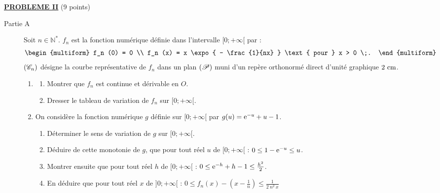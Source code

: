 \noindent \underline{\textsc{\textbf{PROBLEME II}}} (9 points) 
      \begin{description}
            \item[Partie A]
                  Soit $n\in\mathbb{N}^*$.
                  $f_n$ est la fonction num\'erique d\'efinie dans l'intervalle $[0;+\infty[$ par : 
                  \[
                        \begin{multiform}
                              f_n (0) = 0 \\
                              f_n (x) = x \expo{ - \frac{1}{nx} } \text{ pour } x > 0 \;.
                        \end{multiform}
                  \]
                  $(\mathscr{C}_n)$ d\'esigne la courbe repr\'esentative de $f_n$ dans un plan $(\mathscr{P})$ muni d'un rep\`ere orthonorm\'e
                  direct \Oij{} d'unit\'e graphique $2~\mathrm{cm}$.
                  \begin{enumerate}
                        \item \begin{enumerate}
                                    \item Montrer que $f_n$ est continue et d\'erivable en $O$.
                                    \item Dresser le tableau de variation de $f_n$ sur $[0;+\infty[$.
                              \end{enumerate}
                        \item On consid\`ere la fonction num\'erique $g$ d\'efinie sur $[0;+\infty[$ par 
                              $g(u) = \mathrm{e}^{-u} + u - 1$.
                              \begin{enumerate}
                                    \item D\'eterminer le sens de variation de $g$ sur $[0;+\infty[$.
                                    \item D\'eduire de cette monotonie de $g$, que pour tout r\'eel $u$ de $[0;+\infty[$ :
                                          $0 \leq 1 - \mathrm{e}^{-u} \leq u$.
                                    \item Montrer ensuite que pour tout r\'eel $h$ de $[0;+\infty[$ : 
                                          $0 \leq \mathrm{e}^{-h} + h - 1 \leq \frac{h^2}{2}$.
                                    \item En d\'eduire que pour tout r\'eel $x$ de $]0;+\infty[$ : 
                                          $0 \leq f_n (x) - \left( x - \frac{1}{n} \right) \leq \frac{1}{2 \ n^2 \ x}$

\end{enumerate}
\end{enumerate}
\end{description}
